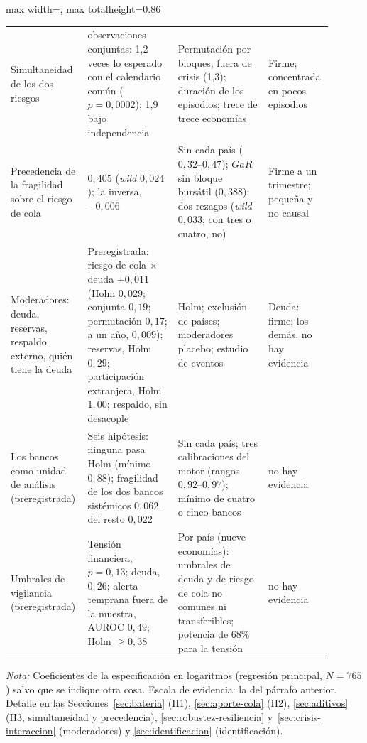 \begin{table}[p]
\begin{adjustbox}{max width=\linewidth, max totalheight=0.86\textheight}
\begin{tabular}{>{\raggedright\arraybackslash}p{0.19\linewidth}>{\raggedright\arraybackslash}p{0.27\linewidth}>{\raggedright\arraybackslash}p{0.27\linewidth}>{\raggedright\arraybackslash}p{0.17\linewidth}}
\addlinespace
Simultaneidad de los dos riesgos & 168 observaciones conjuntas: 1,2 veces lo esperado con el calendario común ($p=0{,}0002$); 1,9 bajo independencia & Permutación por bloques; fuera de crisis (1,3); duración de los episodios; trece de trece economías & Firme; concentrada en pocos episodios \\
\addlinespace
Precedencia de la fragilidad sobre el riesgo de cola & $0{,}405$ (\textit{wild} $0{,}024$); la inversa, $-0{,}006$ & Sin cada país ($0{,}32$--$0{,}47$); $GaR$ sin bloque bursátil ($0{,}388$); dos rezagos (\textit{wild} $0{,}033$; con tres o cuatro, no) & Firme a un trimestre; pequeña y no causal \\
\addlinespace
Moderadores: deuda, reservas, respaldo externo, quién tiene la deuda & Preregistrada: riesgo de cola $\times$ deuda $+0{,}011$ (Holm $0{,}029$; conjunta $0{,}19$; permutación $0{,}17$; a un año, $0{,}009$); reservas, Holm $0{,}29$; participación extranjera, Holm $1{,}00$; respaldo, sin desacople & Holm; exclusión de países; moderadores placebo; estudio de eventos & Deuda: firme; los demás, no hay evidencia \\
\addlinespace
Los bancos como unidad de análisis (preregistrada) & Seis hipótesis: ninguna pasa Holm (mínimo $0{,}88$); fragilidad de los dos bancos sistémicos $0{,}062$, del resto $0{,}022$ & Sin cada país; tres calibraciones del motor (rangos $0{,}92$--$0{,}97$); mínimo de cuatro o cinco bancos & no hay evidencia \\
\addlinespace
Umbrales de vigilancia (preregistrada) & Tensión financiera, $p=0{,}13$; deuda, $0{,}26$; alerta temprana fuera de la muestra, AUROC $0{,}49$; Holm $\geq0{,}38$ & Por país (nueve economías): umbrales de deuda y de riesgo de cola no comunes ni transferibles; potencia de 68\% para la tensión & no hay evidencia \\
\bottomrule
\end{tabular}
\end{adjustbox}
\par\smallskip\parbox{0.95\linewidth}{\footnotesize \textit{Nota:} Coeficientes de la especificación en logaritmos (regresión principal, $N=765$) salvo que se indique otra cosa. Escala de evidencia: la del párrafo anterior. Detalle en las Secciones~\ref{sec:bateria} (H1), \ref{sec:aporte-cola} (H2), \ref{sec:aditivos} (H3, simultaneidad y precedencia), \ref{sec:robustez-resiliencia} y~\ref{sec:crisis-interaccion} (moderadores) y \ref{sec:identificacion} (identificación).}
\end{table}

